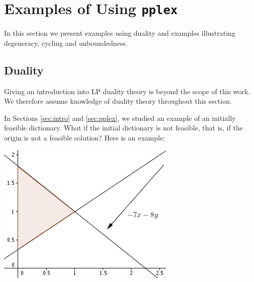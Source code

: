 \documentclass[ukenglish]{nik}
\begin{document}
\section{Examples of Using \texttt{pplex}}\label{sec:examples}
In this section we present examples using duality and examples illustrating
degeneracy, cycling and unboundedness.

\subsection{Duality}

Giving an introduction into LP duality theory is beyond the scope of this work. We therefore assume knowledge of duality theory throughout this section.

In Sections \ref{sec:intro} and \ref{sec:pplex}, we studied an example of an initially feasible dictionary.
What if the initial dictionary is not feasible, that is, if the origin is not a
feasible solution? Here is an example:

\begin{minipage}{.45\textwidth}
\begin{alltt}

\end{alltt}
\end{minipage}
\begin{minipage}{.45\textwidth}
	\includegraphics{ex_dual.jpg}
\end{minipage}
\vspace{.2cm}
\end{document}
